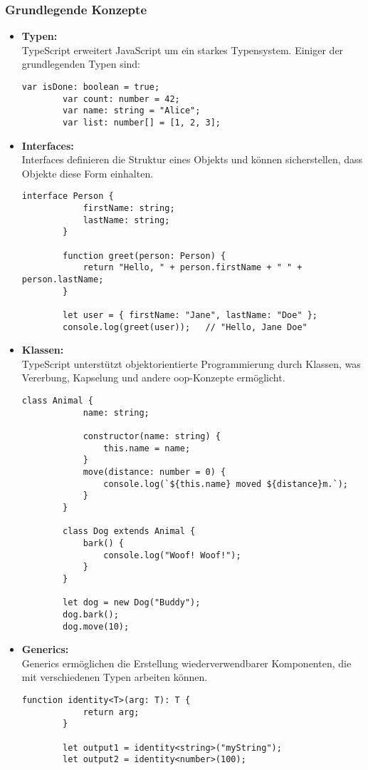 \newpage

\subsubsection[Grundlegende Konzepte]{Grundlegende Konzepte}
\begin{itemize}
    \item \textbf{Typen:} \\
     TypeScript erweitert JavaScript um ein starkes Typensystem. Einiger der grundlegenden Typen sind:
     \begin{lstlisting}[caption={Beispiel: Typen in TypeScript}]
        var isDone: boolean = true;
        var count: number = 42;
        var name: string = "Alice";
        var list: number[] = [1, 2, 3];
     \end{lstlisting}
    \item \textbf{Interfaces:} \\
    Interfaces definieren die Struktur eines Objekts und können sicherstellen, dass Objekte diese Form einhalten.
    \begin{lstlisting}[caption={Beispiel: Interfaces in TypeScript}]
        interface Person {
            firstName: string;
            lastName: string;
        }

        function greet(person: Person) {
            return "Hello, " + person.firstName + " " + person.lastName;
        }

        let user = { firstName: "Jane", lastName: "Doe" };
        console.log(greet(user));   // "Hello, Jane Doe"
    \end{lstlisting}
    \item \textbf{Klassen:} \\
    TypeScript unterstützt objektorientierte Programmierung durch Klassen, was Vererbung, Kapselung und andere \gls{oop}-Konzepte ermöglicht.
    \begin{lstlisting}[caption={Beispiel: Klassen in TypeScript}]
        class Animal {
            name: string;

            constructor(name: string) {
                this.name = name;
            }
            move(distance: number = 0) {
                console.log(`${this.name} moved ${distance}m.`);
            }
        }

        class Dog extends Animal {
            bark() {
                console.log("Woof! Woof!");
            }
        }

        let dog = new Dog("Buddy");
        dog.bark();
        dog.move(10);
    \end{lstlisting}
    \item \textbf{Generics:} \\
    Generics ermöglichen die Erstellung wiederverwendbarer Komponenten, die mit verschiedenen Typen arbeiten können.
    \begin{lstlisting}[caption={Beispiel: Generics in TypeScript}]
        function identity<T>(arg: T): T {
            return arg;
        }

        let output1 = identity<string>("myString");
        let output2 = identity<number>(100);
    \end{lstlisting}
\end{itemize}

